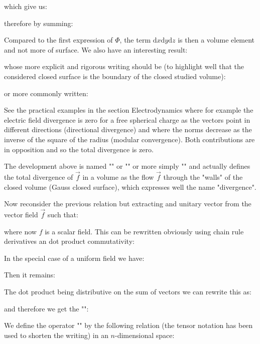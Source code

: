 	which give us:
	
	therefore by summing:
	
	Compared to the first expression of $\Phi$, the term $\mathrm{d}x\mathrm{d}y\mathrm{d}z$ is then a volume element and not more of surface. We also have an interesting result:
	
	whose more explicit and rigorous writing  should be (to highlight well that the considered closed surface is the boundary of the closed studied volume):
	
	or more commonly written:
	
	\begin{tcolorbox}[title=Remark,colframe=black,arc=10pt]
	See the practical examples in the section Electrodynamics where for example the electric field divergence is zero for a free spherical charge as the vectors point in different directions (directional divergence) and where the norms decrease as the inverse of the square of the radius (modular convergence). Both contributions are in opposition and so the total divergence is zero.
	\end{tcolorbox}
	The development above is named "" or "\label{gauss ostrogradsky theorem}" or more simply "" and actually defines the total divergence of $\vec{f}$ in a volume as the flow $\vec{f}$ through the "walls" of the closed volume (Gauss closed surface), which expresses well the name "divergence".
	
	Now reconsider the previous relation but extracting and unitary vector from the vector field $\vec{f}$ such that:
	
	where now $f$ is a scalar field. This can be rewritten obviously using chain rule derivatives an dot product commutativity:
	
	In the special case of a uniform field we have:
	
	Then it remains:
	
	The dot product being distributive on the sum of vectors we can rewrite this as:
	
	and therefore we get the "":
	
	
	We define the operator "" by the following relation (the tensor notation has been used to shorten the writing) in an $n$-dimensional space:
	
